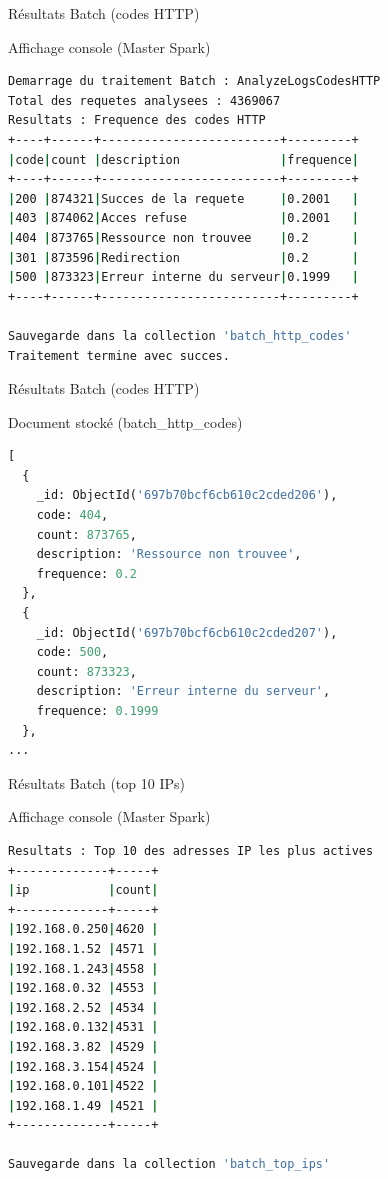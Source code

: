 \documentclass[aspectratio=169]{beamer}
\begin{document}
\begin{frame}[fragile]{Résultats Batch (codes HTTP)}
    
    \begin{exampleblock}{Affichage console (Master Spark)}
\begin{lstlisting}[language=Bash]
Demarrage du traitement Batch : AnalyzeLogsCodesHTTP
Total des requetes analysees : 4369067
Resultats : Frequence des codes HTTP
+----+------+-------------------------+---------+
|code|count |description              |frequence|
+----+------+-------------------------+---------+
|200 |874321|Succes de la requete     |0.2001   |
|403 |874062|Acces refuse             |0.2001   |
|404 |873765|Ressource non trouvee    |0.2      |
|301 |873596|Redirection              |0.2      |
|500 |873323|Erreur interne du serveur|0.1999   |
+----+------+-------------------------+---------+

Sauvegarde dans la collection 'batch_http_codes'
Traitement termine avec succes.
\end{lstlisting}
    \end{exampleblock}
\end{frame}

\begin{frame}[fragile]{Résultats Batch (codes HTTP)}
    
    \begin{exampleblock}{Document stocké (batch\_http\_codes)}
\begin{lstlisting}[language=Python]
[
  {
    _id: ObjectId('697b70bcf6cb610c2cded206'),
    code: 404,
    count: 873765,
    description: 'Ressource non trouvee',
    frequence: 0.2
  },
  {
    _id: ObjectId('697b70bcf6cb610c2cded207'),
    code: 500,
    count: 873323,
    description: 'Erreur interne du serveur',
    frequence: 0.1999
  }, 
...
\end{lstlisting}
    \end{exampleblock}
\end{frame}

\begin{frame}[fragile]{Résultats Batch (top 10 IPs)}
    
    \begin{exampleblock}{Affichage console (Master Spark)}
\begin{lstlisting}[language=Bash]
Resultats : Top 10 des adresses IP les plus actives
+-------------+-----+
|ip           |count|
+-------------+-----+
|192.168.0.250|4620 |
|192.168.1.52 |4571 |
|192.168.1.243|4558 |
|192.168.0.32 |4553 |
|192.168.2.52 |4534 |
|192.168.0.132|4531 |
|192.168.3.82 |4529 |
|192.168.3.154|4524 |
|192.168.0.101|4522 |
|192.168.1.49 |4521 |
+-------------+-----+

Sauvegarde dans la collection 'batch_top_ips'
\end{lstlisting}
    \end{exampleblock}
\end{frame}
\end{document}
